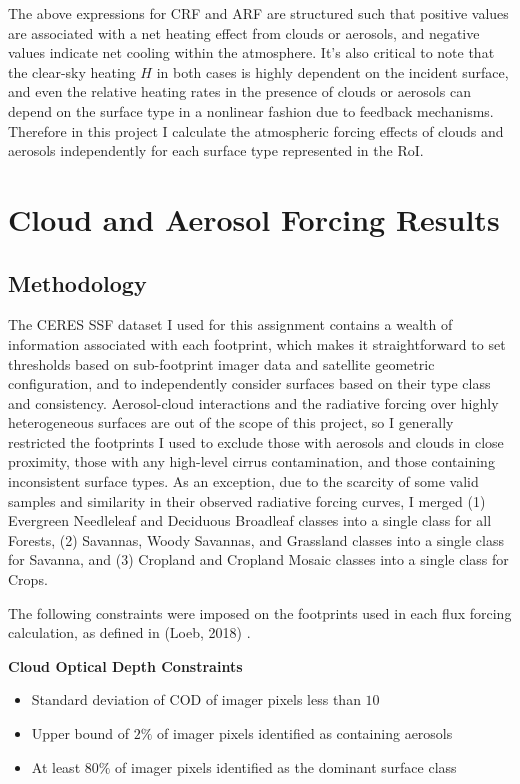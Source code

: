 \documentclass[12pt]{article}
\begin{document}
    The above expressions for CRF and ARF are structured such that positive values are associated with a net heating effect from clouds or aerosols, and negative values indicate net cooling within the atmosphere. It's also critical to note that the clear-sky heating $H$ in both cases is highly dependent on the incident surface, and even the relative heating rates in the presence of clouds or aerosols can depend on the surface type in a nonlinear fashion due to feedback mechanisms. Therefore in this project I calculate the atmospheric forcing effects of clouds and aerosols independently for each surface type represented in the RoI.

    \section{Cloud and Aerosol Forcing Results}

    \subsection{Methodology}

    The CERES SSF dataset I used for this assignment contains a wealth of information associated with each footprint, which makes it straightforward to set thresholds based on sub-footprint imager data and satellite geometric configuration, and to independently consider surfaces based on their type class and consistency. Aerosol-cloud interactions and the radiative forcing over highly heterogeneous surfaces are out of the scope of this project, so I generally restricted the footprints I used to exclude those with aerosols and clouds in close proximity, those with any high-level cirrus contamination, and those containing inconsistent surface types. As an exception, due to the scarcity of some valid samples and similarity in their observed radiative forcing curves, I merged (1) Evergreen Needleleaf and Deciduous Broadleaf classes into a single class for all Forests, (2) Savannas, Woody Savannas, and Grassland classes into a single class for Savanna, and (3) Cropland and Cropland Mosaic classes into a single class for Crops.

    The following constraints were imposed on the footprints used in each flux forcing calculation, as defined in (Loeb, 2018) \cite{loeb_503_2018}.

    \noindent
    \textbf{Cloud Optical Depth Constraints}
    \begin{itemize}[itemsep=0pt, parsep=0pt, before=\setlength{\baselineskip}{6mm}]
        \item Standard deviation of COD of imager pixels less than $10$
        \item Upper bound of $2\%$ of imager pixels identified as containing aerosols
        \item At least $80\%$ of imager pixels identified as the dominant surface class
    \end{itemize}
\end{document}

